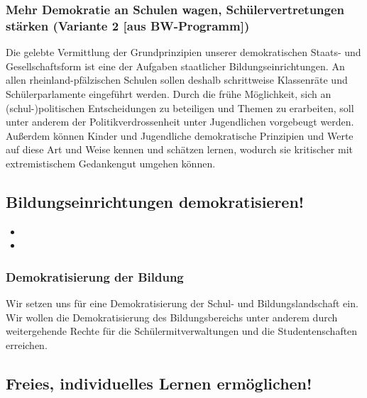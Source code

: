 \subsubsection{Mehr Demokratie an Schulen wagen, Schülervertretungen stärken (Variante 2 [aus BW-Programm])}
\abstimmung
Die gelebte Vermittlung der Grundprinzipien unserer demokratischen Staats- und Gesellschaftsform ist eine der Aufgaben staatlicher Bildungseinrichtungen. An allen rheinland-pfälzischen Schulen sollen deshalb schrittweise Klassenräte und Schülerparlamente eingeführt werden. Durch die frühe Möglichkeit, sich an (schul-)politischen Entscheidungen zu beteiligen und Themen zu erarbeiten, soll unter anderem der Politikverdrossenheit unter Jugendlichen vorgebeugt werden. Außerdem können Kinder und Jugendliche demokratische Prinzipien und Werte auf diese Art und Weise kennen und schätzen lernen, wodurch sie kritischer mit extremistischem Gedankengut umgehen können.
 
\subsection*{Bildungseinrichtungen demokratisieren!}
\label{wp:bildung:demokratie3}
\begin{itemize}
\item {}
\item {}
\end{itemize}

\subsubsection{Demokratisierung der Bildung}
\abstimmung
Wir setzen uns für eine Demokratisierung der Schul- und Bildungslandschaft ein. Wir wollen die Demokratisierung des Bildungsbereichs unter anderem durch weitergehende Rechte für die Schülermitverwaltungen und die Studentenschaften erreichen.
 
\subsection*{Freies, individuelles Lernen ermöglichen!}
\label{wp:bildung:frei1}

